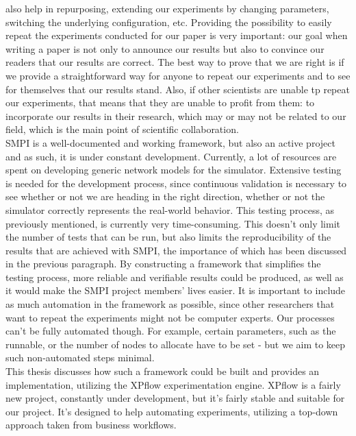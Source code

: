also help in repurposing, extending our experiments by changing
parameters, switching the underlying configuration, etc. Providing the
possibility to easily repeat the experiments conducted for our paper
is very important: our goal when writing a paper is not only to
announce our results but also to convince our readers that our results
are correct.\cite{m10} The best way to prove that we are right is if
we provide a straightforward way for anyone to repeat our experiments
and to see for themselves that our results stand. Also, if other
scientists are unable tp repeat our experiments, that means that they
are unable to profit from them: to incorporate our results in their
research, which may or may not be related to our field, which is the
main point of scientific collaboration.\\
SMPI is a well-documented and working framework, but also an active
project and as such, it is under constant development. Currently, a
lot of resources are spent on developing generic network models for
the simulator. Extensive testing is needed for the development
process, since continuous validation is necessary to see whether or
not we are heading in the right direction, whether or not the
simulator correctly represents the real-world behavior. This
testing process, as previously mentioned, is currently very
time-consuming. This doesn't only limit the number of tests that can
be run, but also limits the reproducibility of the
results that are achieved with SMPI, the importance of which has been
discussed in the previous paragraph. By constructing a framework that
simplifies the testing process, more reliable and verifiable results
could be produced, as well as it would make the SMPI project members'
lives easier. It is important to include as much automation in the
framework as possible, since other researchers that want to repeat the
experiments might not be computer experts. Our processes can't be
fully automated though. For example, certain parameters, such as the
runnable, or the number of nodes to allocate have to be set - but we
aim to keep such non-automated steps minimal.\\
This thesis discusses how such a framework could be built and provides
an implementation, utilizing the XPflow\cite{bn12_2} experimentation
engine. XPflow is a fairly new project, constantly under development,
but it's fairly stable and suitable for our project. It's designed to
help automating experiments, utilizing a top-down approach taken from
business workflows.
